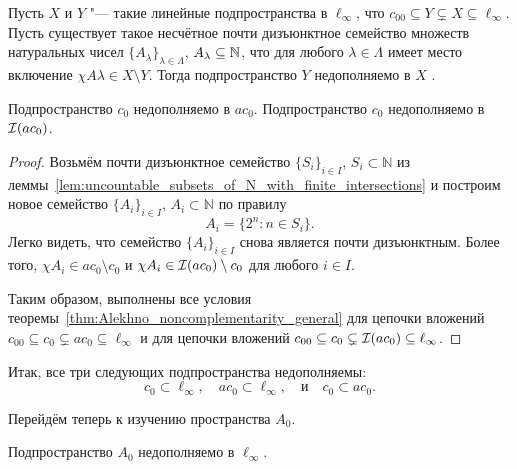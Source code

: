 \begin{theorem}
	\label{thm:Alekhno_noncomplementarity_general}
	Пусть $X$ и $Y$ "--- такие линейные подпространства в $\ell_\infty$,
	что $c_{00} \subseteq Y \subsetneq X \subseteq \ell_\infty$.
	Пусть существует такое несчётное почти дизъюнктное семейство множеств натуральных чисел $\{A_\lambda\}_{\lambda \in \Lambda}$,
	$A_\lambda \subseteq \mathbb{N}$, что для любого $\lambda \in \Lambda$ имеет место включение $\chi {A\lambda} \in X \setminus Y$.
	Тогда подпространство $Y$ недополняемо в $X$ .
\end{theorem}

\begin{corollary}
	Подпространство $c_0$ недополняемо в $ac_0$.
	Подпространство $c_0$ недополняемо в $\mathcal{I}(ac_0)$.
\end{corollary}

\begin{proof}
	Возьмём почти дизъюнктное семейство $\{S_i\}_{i\in I}$, $S_i \subset \mathbb{N}$
	из леммы~\ref{lem:uncountable_subsets_of_N_with_finite_intersections}
	и построим новое семейство $\{A_i\}_{i\in I}$, $A_i \subset \mathbb{N}$
	по правилу
	\begin{equation}
		\label{eq:c0_noncomplemented_in_ac0_set_family}
		A_i = \{ 2^n : n\in S_i \}
		.
	\end{equation}
	Легко видеть, что семейство $\{A_i\}_{i\in I}$ снова является почти дизъюнктным.
	Более того, $\chi {A_i} \in ac_0 \setminus c_0$ и $\chi {A_i} \in \mathcal{I}(ac_0) \setminus c_0$ для любого $i\in I$.

	Таким образом, выполнены все условия теоремы~\ref{thm:Alekhno_noncomplementarity_general}
	для цепочки вложений $c_{00} \subseteq c_0 \subsetneq ac_0 \subseteq \ell_\infty$ и
	для цепочки вложений $c_{00} \subseteq c_0 \subsetneq \mathcal{I}(ac_0) \subseteq \ell_\infty$.
\end{proof}


Итак, все три следующих подпространства недополняемы:
\begin{equation}
	c_0 \subset \ell_\infty,
	\quad
	ac_0 \subset \ell_\infty,
	\quad\mbox{и}\quad
	c_0 \subset ac_0
	.
\end{equation}


Перейдём теперь к изучению пространства $A_0$.

\begin{lemma}
	Подпространство $A_0$ недополняемо в $\ell_\infty$.
\end{lemma}

